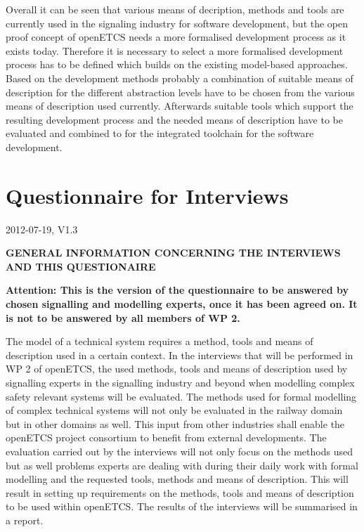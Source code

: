 \documentclass{./template/openetcs2}
\begin{document}
Overall it can be seen that various means of decription, methods and tools are currently used in the signaling industry for software development, but the open proof concept of openETCS needs a more formalised development process as it exists today. Therefore it is necessary to select a more formalised  development process has to be defined which builds on the existing model-based approaches. Based on the development methods probably a combination of suitable means of description for the different abstraction levels have to be chosen from the various means of description used currently. Afterwards suitable tools which support the resulting development process and the needed means of description have to be evaluated and combined to for the integrated toolchain for the software development.

\appendix

\chapter{Questionnaire for Interviews}
\label{chap: questionnaire}

2012-07-19, V1.3 

\textbf{\Large GENERAL INFORMATION CONCERNING THE INTERVIEWS AND THIS QUESTIONAIRE}

\textbf {Attention: This is the version of the questionnaire to be answered by chosen signalling and modelling experts, once it has been agreed on. It is not to be answered by all members of WP 2.}

The model of a technical system requires a method, tools and means of description used in a certain context. In the interviews that will be performed in WP 2 of openETCS, the used methods, tools and means of description used by signalling experts in the signalling industry and beyond when modelling complex safety relevant systems will be evaluated. The methods used for formal modelling of complex technical systems will not only be evaluated in the railway domain but in other domains as well. This input from other industries shall enable the openETCS project consortium to benefit from external developments.
The evaluation carried out by the interviews will not only focus on the methods used but as well problems experts are dealing with during their daily work with formal modelling and the requested tools, methods and means of description. This will result in setting up requirements on the methods, tools and means of description to be used within openETCS. The results of the interviews will be summarised in a report.
\end{document}

